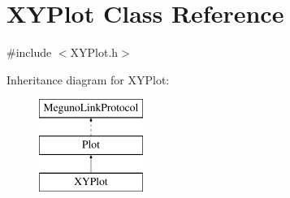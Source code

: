 \hypertarget{class_x_y_plot}{\section{X\-Y\-Plot Class Reference}
\label{class_x_y_plot}
}


{\ttfamily \#include $<$X\-Y\-Plot.\-h$>$}

Inheritance diagram for X\-Y\-Plot\-:\begin{figure}[H]
\begin{center}
\leavevmode
\includegraphics[height=3.000000cm]{class_x_y_plot}
\end{center}
\end{figure}
